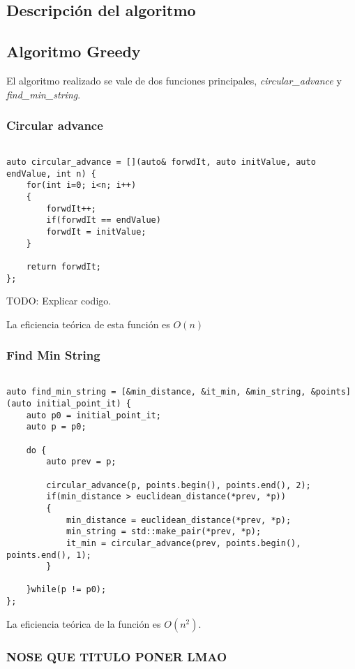 \documentclass[a4paper, 11pt]{article}
\begin{document}
\subsection{Descripción del algoritmo}

\subsection{Algoritmo Greedy}
El algoritmo realizado se vale de dos funciones principales, \textit{circular\_advance} y \textit{find\_min\_string}.

\subsubsection{Circular advance}
\begin{lstlisting}

auto circular_advance = [](auto& forwdIt, auto initValue, auto endValue, int n) {
	for(int i=0; i<n; i++)
	{
		forwdIt++;
		if(forwdIt == endValue)
		forwdIt = initValue;
	}

	return forwdIt;
};
\end{lstlisting}

TODO: Explicar codigo.

La eficiencia teórica de esta función es $O(n)$

\subsubsection{Find Min String}
\begin{lstlisting}
	
auto find_min_string = [&min_distance, &it_min, &min_string, &points](auto initial_point_it) {
	auto p0 = initial_point_it;
	auto p = p0;
	
	do {
		auto prev = p;
	
		circular_advance(p, points.begin(), points.end(), 2);
		if(min_distance > euclidean_distance(*prev, *p))
		{
			min_distance = euclidean_distance(*prev, *p);
			min_string = std::make_pair(*prev, *p);
			it_min = circular_advance(prev, points.begin(), points.end(), 1);
		}
	
	}while(p != p0);
};
\end{lstlisting}

La eficiencia teórica de la función es $O(n^2)$.
\subsubsection{NOSE QUE TITULO PONER LMAO}
\end{document}
